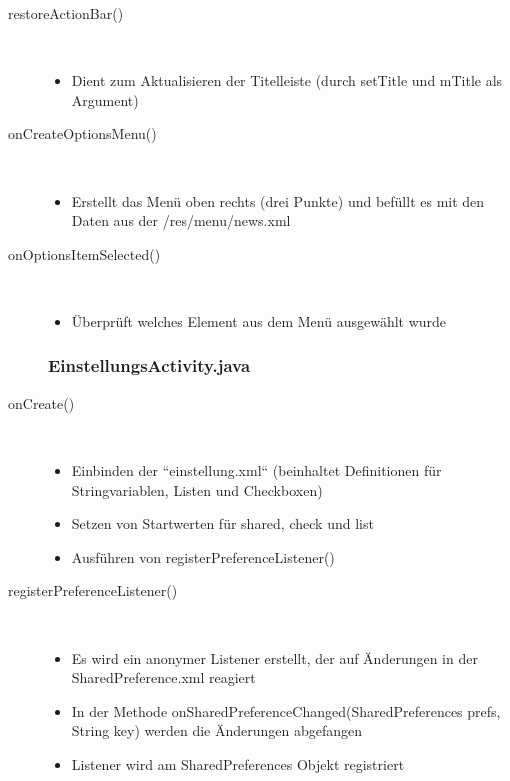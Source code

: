 \begin{description}
 
\item[restoreActionBar()]~\par
\begin{itemize}
\item Dient zum Aktualisieren der Titelleiste (durch setTitle und mTitle als Argument)
\end{itemize}

 
\item[onCreateOptionsMenu()]~\par
\begin{itemize}
\item Erstellt das Menü oben rechts (drei Punkte) und befüllt es mit den Daten aus der /res/menu/news.xml
\end{itemize}

 
\item[onOptionsItemSelected()]~\par
\begin{itemize}
\item Überprüft welches Element aus dem Menü ausgewählt wurde
\end{itemize}


\subsubsection{EinstellungsActivity.java}
 
\item[onCreate()]~\par
\begin{itemize}
\item Einbinden der “einstellung.xml“ (beinhaltet Definitionen für Stringvariablen, Listen und Checkboxen)
\item Setzen von Startwerten für shared, check und list
\item Ausführen von registerPreferenceListener()
\end{itemize}


\item[registerPreferenceListener()]~\par
\begin{itemize}
\item Es wird ein anonymer Listener erstellt, der auf Änderungen in der SharedPreference.xml reagiert
\item In der Methode onSharedPreferenceChanged(SharedPreferences prefs, String key) werden die Änderungen abgefangen
\item Listener wird am SharedPreferences Objekt  registriert
\end{itemize}


\end{description}

